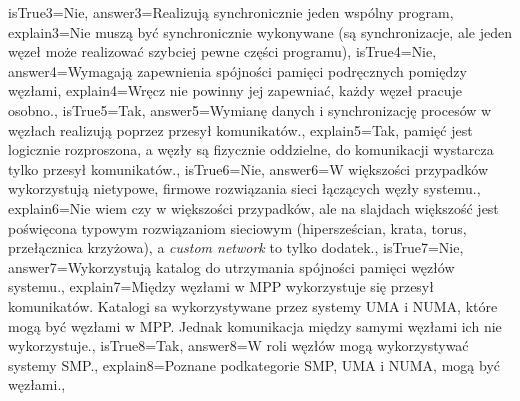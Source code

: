 \begin{enumerate}
\begin{minipage}{\textwidth}
{		isTrue3={Nie},%
		answer3={Realizują synchronicznie jeden wspólny program},%
		explain3={Nie muszą być synchronicznie wykonywane (są synchronizacje, ale jeden węzeł może realizować szybciej pewne części programu)},%
		isTrue4={Nie},%
		answer4={Wymagają zapewnienia spójności pamięci podręcznych pomiędzy węzłami},%
		explain4={Wręcz nie powinny jej zapewniać, każdy węzeł pracuje osobno.},%
		isTrue5={Tak},%
		answer5={Wymianę danych i synchronizację procesów w węzłach realizują poprzez przesył komunikatów.},%
		explain5={Tak, pamięć jest logicznie rozproszona, a węzły są fizycznie oddzielne, do komunikacji wystarcza tylko przesył komunikatów.},%
		isTrue6={Nie},%
		answer6={W większości przypadków wykorzystują nietypowe, firmowe rozwiązania sieci łączących węzły systemu.},%
		explain6={Nie wiem czy w większości przypadków, ale na slajdach większość jest poświęcona typowym rozwiązaniom sieciowym (hipersześcian, krata, torus, przełącznica krzyżowa), a \emph{custom network} to tylko dodatek.},%
		isTrue7={Nie},%
		answer7={Wykorzystują katalog do utrzymania spójności pamięci węzłów systemu.},%
		explain7={Między węzłami w MPP wykorzystuje się przesył komunikatów. Katalogi sa wykorzystywane przez systemy UMA i NUMA, które mogą być węzłami w MPP. Jednak komunikacja między samymi węzłami ich nie wykorzystuje.},%
		isTrue8={Tak},%
		answer8={W roli węzłów mogą wykorzystywać systemy SMP.},%
		explain8={Poznane podkategorie SMP, UMA i NUMA, mogą być węzłami.},%
	}
\end{minipage}
\begin{minipage}{\textwidth}
\end{minipage}
\begin{minipage}{\textwidth}
\end{minipage}
\end{enumerate}
